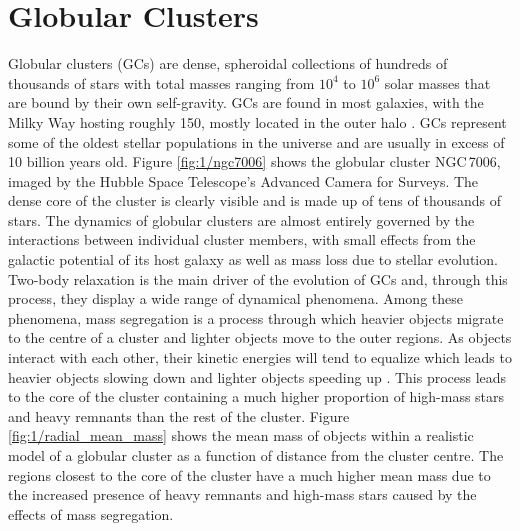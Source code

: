 

\section{Globular Clusters}


Globular clusters (GCs) are dense, spheroidal collections of hundreds of thousands of stars with
total masses ranging from $10^4$ to $10^6$ solar masses that are bound by their own self-gravity.
GCs are found in most galaxies, with the Milky Way hosting roughly 150, mostly located in the outer
halo \citep[e.g.][]{Heggie2003}. GCs represent some of the oldest stellar populations in the
universe and are usually in excess of 10 billion years old. Figure \ref{fig:1/ngc7006} shows the
globular cluster NGC\,7006, imaged by the Hubble Space Telescope's Advanced Camera for Surveys. The
dense core of the cluster is clearly visible and is made up of tens of thousands of stars. The
dynamics of globular clusters are almost entirely governed by the interactions between individual
cluster members, with small effects from the galactic potential of its host galaxy as well as mass
loss due to stellar evolution. Two-body relaxation is the main driver of the evolution of GCs and,
through this process, they display a wide range of dynamical phenomena. Among these phenomena, mass
segregation is a process through which heavier objects migrate to the centre of a cluster and
lighter objects move to the outer regions. As objects interact with each other, their kinetic
energies will tend to equalize which leads to heavier objects slowing down and lighter objects
speeding up \citep[e.g.][]{Heggie2003}. This process leads to the core of the cluster containing a
much higher proportion of high-mass stars and heavy remnants than the rest of the cluster. Figure
\ref{fig:1/radial_mean_mass} shows the mean mass of objects within a realistic model of a globular
cluster as a function of distance from the cluster centre. The regions closest to the core of the
cluster have a much higher mean mass due to the increased presence of heavy remnants and high-mass
stars caused by the effects of mass segregation.

